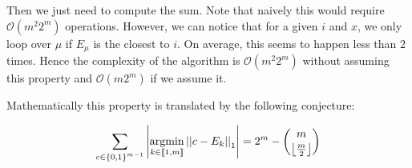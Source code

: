 Then we just need to compute the sum. Note that naively this would require $\mathcal O(m^2 2^m)$ operations. However, we can notice that for a given $i$ and $x$, we only loop over $\mu$ if $E_{\mu}$ is the closest to $i$. On average, this seems to happen less than $2$ times. Hence the complexity of the algorithm is $\mathcal O(m^2 2^m)$ without assuming this property and $\mathcal O(m 2^m)$ if we assume it.

Mathematically this property is translated by the following conjecture:

\begin{conjecture}
    \[ \sum_{c \in \left\{ 0, 1 \right\}^{m - 1}} \left|\operatorname*{argmin}_{k \in \left\llbracket1, m\right\rrbracket} \left|\left|c - E_k\right|\right|_1\right| = 2^{m} - \binom{m}{\left\lfloor \frac{m}{2} \right\rfloor} \]
\end{conjecture}
